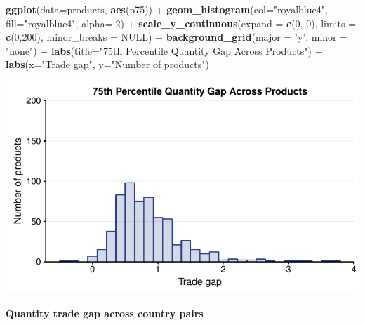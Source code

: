\documentclass[10pt,]{article}
\newenvironment{Shaded}{\begin{snugshade}}{\end{snugshade}}
\newcommand{\KeywordTok}[1]{\textcolor[rgb]{0.13,0.29,0.53}{\textbf{{#1}}}}
\newcommand{\DataTypeTok}[1]{\textcolor[rgb]{0.13,0.29,0.53}{{#1}}}
\newcommand{\DecValTok}[1]{\textcolor[rgb]{0.00,0.00,0.81}{{#1}}}
\newcommand{\StringTok}[1]{\textcolor[rgb]{0.31,0.60,0.02}{{#1}}}
\newcommand{\OtherTok}[1]{\textcolor[rgb]{0.56,0.35,0.01}{{#1}}}
\newcommand{\NormalTok}[1]{{#1}}
\begin{document}
\begin{Shaded}
\begin{Highlighting}[]
\KeywordTok{ggplot}\NormalTok{(}\DataTypeTok{data=}\NormalTok{products, }\KeywordTok{aes}\NormalTok{(p75)) +}
\StringTok{  }\KeywordTok{geom_histogram}\NormalTok{(}\DataTypeTok{col=}\StringTok{"royalblue4"}\NormalTok{,}
                 \DataTypeTok{fill=}\StringTok{"royalblue4"}\NormalTok{,}
                 \DataTypeTok{alpha=}\NormalTok{.}\DecValTok{2}\NormalTok{) +}
\StringTok{  }\KeywordTok{scale_y_continuous}\NormalTok{(}\DataTypeTok{expand =} \KeywordTok{c}\NormalTok{(}\DecValTok{0}\NormalTok{, }\DecValTok{0}\NormalTok{), }\DataTypeTok{limits =} \KeywordTok{c}\NormalTok{(}\DecValTok{0}\NormalTok{,}\DecValTok{200}\NormalTok{), }\DataTypeTok{minor_breaks =} \OtherTok{NULL}\NormalTok{) +}
\StringTok{  }\KeywordTok{background_grid}\NormalTok{(}\DataTypeTok{major =} \StringTok{'y'}\NormalTok{, }\DataTypeTok{minor =} \StringTok{"none"}\NormalTok{) +}
\StringTok{  }\KeywordTok{labs}\NormalTok{(}\DataTypeTok{title=}\StringTok{"75th Percentile Quantity Gap Across Products"}\NormalTok{) +}
\StringTok{  }\KeywordTok{labs}\NormalTok{(}\DataTypeTok{x=}\StringTok{"Trade gap"}\NormalTok{, }\DataTypeTok{y=}\StringTok{"Number of products"}\NormalTok{)}
\end{Highlighting}
\end{Shaded}

\begin{center}\includegraphics{Figs/quantity_products-4} \end{center}

\textbf{Quantity trade gap across country pairs}
\end{document}
